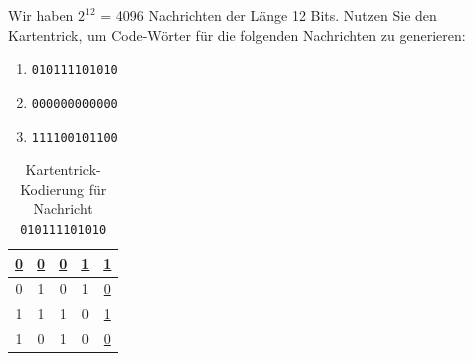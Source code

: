 \begin{myexercise}
    Wir haben $2^{12}$ = 4096 Nachrichten der Länge 12 Bits. Nutzen Sie den Kartentrick, um Code-Wörter für die folgenden Nachrichten zu generieren:

    \begin{enumerate}
        \item \texttt{010111101010}
        \item \texttt{000000000000}
        \item \texttt{111100101100}
    \end{enumerate}

    \begin{myanswer}
        \begin{table}[H]
            \centering
            \begin{tabular}{c|c|c|c|c}
                \underline{0} & \underline{0} & \underline{0} & \underline{1} & \underline{1} \\ \midrule\midrule
                0             & 1             & 0             & 1             & \underline{0} \\ \midrule
                1             & 1             & 1             & 0             & \underline{1} \\ \midrule
                1             & 0             & 1             & 0             & \underline{0} \\
            \end{tabular}
            \caption{Kartentrick-Kodierung für Nachricht \texttt{010111101010}}
            \label{tab:codeword1}
        \end{table}
    \end{myanswer}
\end{myexercise}

